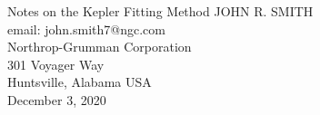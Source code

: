 \begin{center}{{\twelvebf Notes on the Kepler Fitting Method}}
		\vglue 0.5cm
 	       {\tenrm JOHN R.\,\,SMITH\\}
	       {email: john.smith7@ngc.com\\}
		\vglue 0.25cm
	       {\tenit Northrop-Grumman Corporation\\
	       301 Voyager Way\\}
                \baselineskip=12pt
                 {\tenit Huntsville, Alabama USA\\}
		\vglue 0.5cm
                 {\rm December 3, 2020\\}
\end{center}